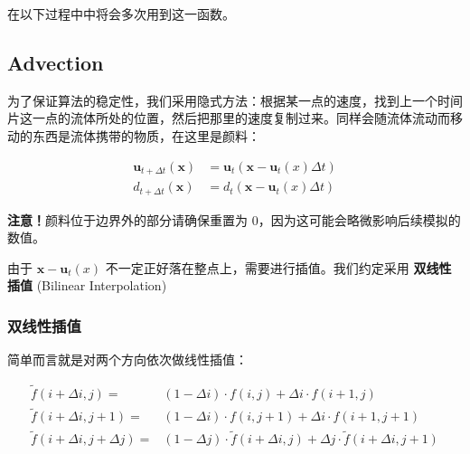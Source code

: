 \documentclass{ctexart}
\begin{document}
在以下过程中中将会多次用到这一函数。

\subsection{Advection}

为了保证算法的稳定性，我们采用隐式方法：根据某一点的速度，找到上一个时间片这一点的流体所处的位置，然后把那里的速度复制过来。同样会随流体流动而移动的东西是流体携带的物质，在这里是颜料：

\begin{equation}
\begin{split}
  \mathbf{u}_{t + \Delta t}(\mathbf{x}) &= \mathbf{u}_t(\mathbf{x} - \mathbf{u}_t(x) \Delta t) \\
  d_{t + \Delta t}(\mathbf{x}) &= d_t(\mathbf{x} - \mathbf{u}_t(x) \Delta t)
\end{split}
\end{equation}

\textbf{注意！}颜料位于边界外的部分请确保重置为 0，因为这可能会略微影响后续模拟的数值。

由于 $\mathbf{x} - \mathbf{u}_t(x)$ 不一定正好落在整点上，需要进行插值。我们约定采用 \textbf{双线性插值} (Bilinear Interpolation)

\subsubsection{双线性插值}

简单而言就是对两个方向依次做线性插值：

\begin{figure}[!h]
  \centering

\end{figure}

\begin{equation}
  \begin{split}
    \tilde f(i+\Delta i,j) = & (1-\Delta i) \cdot f(i, j) + \Delta i \cdot f(i + 1, j) \\
    \tilde f(i+\Delta i,j+1) = & (1-\Delta i) \cdot f(i, j+1) + \Delta i \cdot f(i + 1, j+1) \\
    \tilde f(i+\Delta i,j + \Delta j) = & (1-\Delta j) \cdot \tilde f(i + \Delta i, j) + \Delta j \cdot \tilde f(i + \Delta i, j + 1)
  \end{split}
\end{equation}
\end{document}
